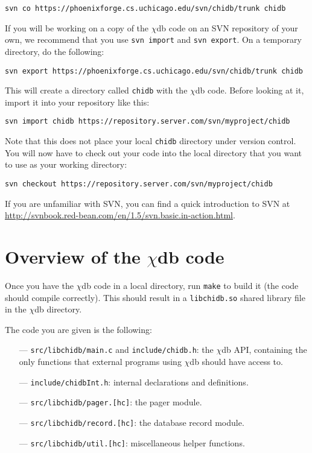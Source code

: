 \documentclass[10pt]{article}
\newcommand{\chidb}{$\chi$\textsf{db}}
\begin{document}
\begin{verbatim}
svn co https://phoenixforge.cs.uchicago.edu/svn/chidb/trunk chidb
\end{verbatim}

If you will be working on a copy of the \chidb{} code on an SVN repository of your own, we recommend that you use \texttt{svn import} and \texttt{svn export}. On a temporary directory, do the following:

\begin{verbatim}
svn export https://phoenixforge.cs.uchicago.edu/svn/chidb/trunk chidb
\end{verbatim}

This will create a directory called \texttt{chidb} with the \chidb{} code. Before looking at it, import it into your  repository like this:

\begin{verbatim}
svn import chidb https://repository.server.com/svn/myproject/chidb
\end{verbatim}

Note that this does not place your local \texttt{chidb} directory under version control. You will now have to check out your code into the local directory that you want to use as your working directory:

\begin{verbatim}
svn checkout https://repository.server.com/svn/myproject/chidb
\end{verbatim}

If you are unfamiliar with SVN, you can find a quick introduction to SVN at \url{http://svnbook.red-bean.com/en/1.5/svn.basic.in-action.html}. 

\section*{Overview of the \chidb{} code}

Once you have the \chidb{} code in a local directory, run \texttt{make} to build it (the code should compile correctly). This should result in a \texttt{libchidb.so} shared library file in the \chidb{} directory.

The code you are given is the following:

\begin{itemize}
\item[---] \texttt{src/libchidb/main.c} and \texttt{include/chidb.h}: the \chidb{} API, containing the only functions that external programs using \chidb{} should have access to.
\item[---] \texttt{include/chidbInt.h}: internal declarations and definitions.
\item[---] \texttt{src/libchidb/pager.[hc]}: the pager module.
\item[---] \texttt{src/libchidb/record.[hc]}: the database record module.
\item[---] \texttt{src/libchidb/util.[hc]}: miscellaneous helper functions.
\end{itemize}
\end{document}

